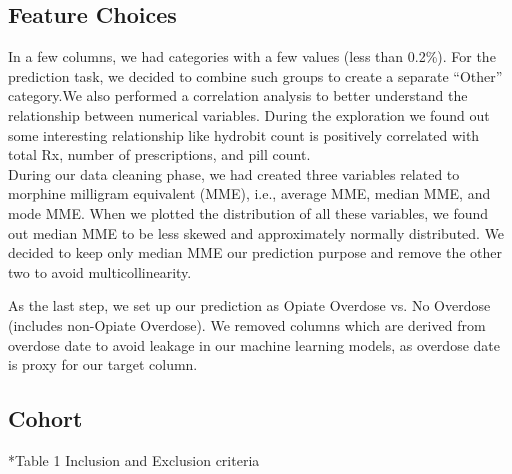 \documentclass[twoside,10.5pt]{article}
\begin{document}
\subsection{Feature Choices}
In a few columns, we had categories with a few values (less than 0.2\%). For the prediction task, we decided to combine such groups to create a separate “Other” category.We also performed a correlation analysis to better understand the relationship between numerical variables. During the exploration we found out some interesting relationship like hydrobit count is positively correlated with total Rx, number of prescriptions, and pill count.\\

During our data cleaning phase, we had created three variables related to morphine milligram equivalent (MME), i.e., average MME, median MME, and mode MME.  When we plotted the distribution of all these variables, we found out median MME to be less skewed and approximately normally distributed. We decided to keep only median MME our prediction purpose and remove the other two to avoid multicollinearity.

As the last step, we set up our prediction as Opiate Overdose vs. No Overdose (includes non-Opiate Overdose). We removed columns which are derived from overdose date to avoid leakage in our machine learning models, as overdose date is proxy for our target column.


\subsection{Cohort}
*Table 1
Inclusion and Exclusion criteria 
\end{document}
